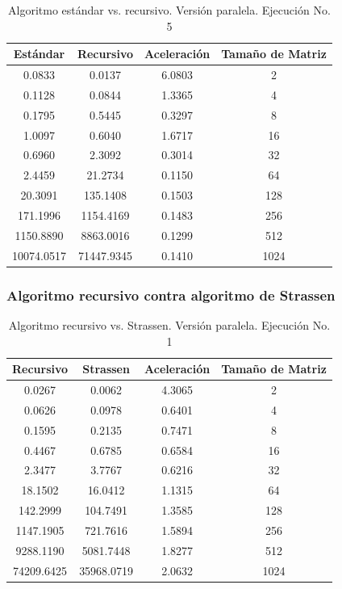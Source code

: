 \documentclass{article}
\begin{document}
\begin{table}[ht]
\centering
\begin{tabular}{|c|c|c|c|}
\hline
\textbf{Estándar} & \textbf{Recursivo} & \textbf{Aceleración} & \textbf{Tamaño de Matriz} \\
\hline
0.0833 & 0.0137 & 6.0803 & 2 \\
0.1128 & 0.0844 & 1.3365 & 4 \\
0.1795 & 0.5445 & 0.3297 & 8 \\
1.0097 & 0.6040 & 1.6717 & 16 \\
0.6960 & 2.3092 & 0.3014 & 32 \\
2.4459 & 21.2734 & 0.1150 & 64 \\
20.3091 & 135.1408 & 0.1503 & 128 \\
171.1996 & 1154.4169 & 0.1483 & 256 \\
1150.8890 & 8863.0016 & 0.1299 & 512 \\
10074.0517 & 71447.9345 & 0.1410 & 1024 \\
\hline
\end{tabular}
\caption{Algoritmo estándar vs. recursivo. Versión paralela. Ejecución No. 5}
\end{table}

\clearpage

\subsubsection{Algoritmo recursivo contra algoritmo de Strassen}

\begin{table}[ht]
\centering
\begin{tabular}{|c|c|c|c|}
\hline
\textbf{Recursivo} & \textbf{Strassen} & \textbf{Aceleración} & \textbf{Tamaño de Matriz} \\
\hline
0.0267 & 0.0062 & 4.3065 & 2 \\
0.0626 & 0.0978 & 0.6401 & 4 \\
0.1595 & 0.2135 & 0.7471 & 8 \\
0.4467 & 0.6785 & 0.6584 & 16 \\
2.3477 & 3.7767 & 0.6216 & 32 \\
18.1502 & 16.0412 & 1.1315 & 64 \\
142.2999 & 104.7491 & 1.3585 & 128 \\
1147.1905 & 721.7616 & 1.5894 & 256 \\
9288.1190 & 5081.7448 & 1.8277 & 512 \\
74209.6425 & 35968.0719 & 2.0632 & 1024 \\
\hline
\end{tabular}
\caption{Algoritmo recursivo vs. Strassen. Versión paralela. Ejecución No. 1}
\end{table}
\end{document}
